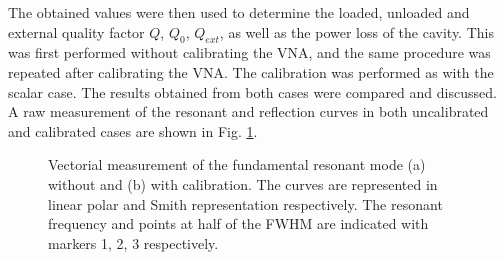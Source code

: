 \documentclass[a4paper]{report}
\numberwithin{equation}{section}
\begin{document}
The obtained values were then used to determine the loaded, unloaded and external quality
factor $Q$, $Q_0$, $Q_{ext}$, as well as the power loss of the cavity. This was first
performed without calibrating the VNA, and the same procedure was repeated after
calibrating the VNA. The calibration was performed as with the scalar case. 
The results obtained from both cases were compared and discussed. A raw measurement of the resonant and reflection curves in
both uncalibrated and calibrated cases are shown in Fig. \ref{fig:vectorial_raw}.   

\begin{figure}[htb!]
	\centering
	\quad

	\caption{Vectorial measurement of the fundamental resonant mode (a) without
	and (b) with calibration. The curves are represented in linear polar and
	Smith representation respectively. The resonant frequency and points at
	half of the FWHM are indicated with markers 1, 2, 3 respectively.
	}
	\label{fig:vectorial_raw}
\end{figure}
\end{document}
